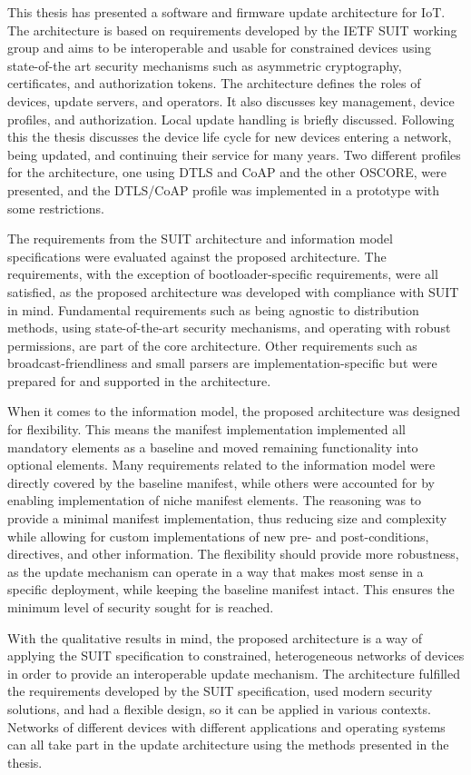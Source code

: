 \documentclass[0-thesis.tex]{subfiles}
\begin{document}
This thesis has presented a software and firmware update architecture for IoT. The
architecture is based on requirements developed by the IETF SUIT working group and aims to
be interoperable and usable for constrained devices using state-of-the art security
mechanisms such as asymmetric cryptography, certificates, and authorization tokens. The
architecture defines the roles of devices, update servers, and operators. It also
discusses key management, device profiles, and authorization. Local update handling is
briefly discussed. Following this the thesis discusses the device life cycle for new
devices entering a network, being updated, and continuing their service for many years.
Two different profiles for the architecture, one using DTLS and CoAP and the other OSCORE,
were presented, and the DTLS/CoAP profile was implemented in a prototype with some
restrictions.

The requirements from the SUIT architecture and information model specifications were
evaluated against the proposed architecture. The requirements, with the exception of
bootloader-specific requirements, were all satisfied, as the proposed architecture was
developed with compliance with SUIT in mind. Fundamental requirements such as being
agnostic to distribution methods, using state-of-the-art security mechanisms, and
operating with robust permissions, are part of the core architecture. Other requirements
such as broadcast-friendliness and small parsers are implementation-specific but were
prepared for and supported in the architecture.

When it comes to the information model, the proposed architecture was designed for
flexibility. This means the manifest implementation implemented all mandatory elements as
a baseline and moved remaining functionality into optional elements. Many requirements
related to the information model were directly covered by the baseline manifest, while
others were accounted for by enabling implementation of niche manifest elements. The
reasoning was to provide a minimal manifest implementation, thus reducing size and
complexity while allowing for custom implementations of new pre- and post-conditions,
directives, and other information. The flexibility should provide more robustness, as the
update mechanism can operate in a way that makes most sense in a specific deployment,
while keeping the baseline manifest intact. This ensures the minimum level of security
sought for is reached. 

With the qualitative results in mind, the proposed architecture is a way of applying the
SUIT specification to constrained, heterogeneous networks of devices in order to provide
an interoperable update mechanism. The architecture fulfilled the requirements developed
by the SUIT specification, used modern security solutions, and had a flexible design, so
it can be applied in various contexts. Networks of different devices with different
applications and operating systems can all take part in the update architecture using the
methods presented in the thesis.
\end{document}
